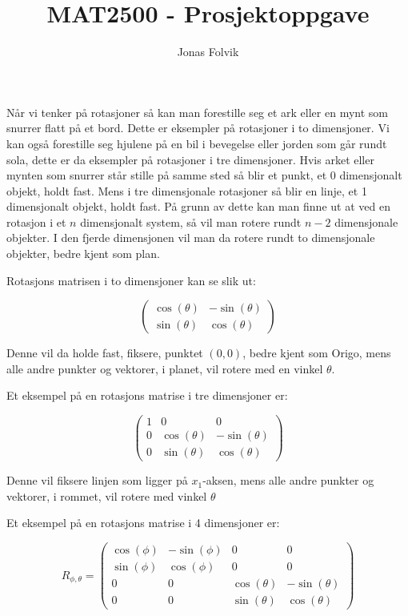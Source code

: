 \documentclass[a4paper,10pt,english]{article}
\title{MAT2500 - Prosjektoppgave}
\author{Jonas Folvik}
\begin{document}
    
    \maketitle

    Når vi tenker på rotasjoner så kan man forestille seg et ark eller en mynt som snurrer flatt på et bord. Dette er eksempler på rotasjoner i to dimensjoner.
    Vi kan også forestille seg hjulene på en bil i bevegelse eller jorden som går rundt sola, dette er da eksempler på rotasjoner i tre dimensjoner.
    Hvis arket eller mynten som snurrer står stille på samme sted så blir et punkt, et 0 dimensjonalt objekt, holdt fast. Mens i tre dimensjonale rotasjoner så blir en linje, et 1 dimensjonalt objekt, holdt fast.
    På grunn av dette kan man finne ut at ved en rotasjon i et $n$ dimensjonalt system, så vil man rotere rundt $n-2$ dimensjonale objekter.
    I den fjerde dimensjonen vil man da rotere rundt to dimensjonale objekter, bedre kjent som plan.

    Rotasjons matrisen i to dimensjoner kan se slik ut:

    $$
    \left(
    \begin{matrix}
        \cos(\theta) & -\sin(\theta) \\
        \sin(\theta) &  \cos(\theta)
    \end{matrix}
    \right)
    $$

    Denne vil da holde fast, fiksere, punktet $(0, 0)$, bedre kjent som Origo, mens alle andre punkter og vektorer, i planet, vil rotere med en vinkel $\theta$.
    
    Et eksempel på en rotasjons matrise i tre dimensjoner er:

    $$
    \left(
    \begin{matrix}
        1 & 0 & 0 \\
        0 & \cos(\theta) & -\sin(\theta) \\
        0 & \sin(\theta) &  \cos(\theta)
    \end{matrix}
    \right)
    $$

    Denne vil fiksere linjen som ligger på $x_{1}$-aksen, mens alle andre punkter og vektorer, i rommet, vil rotere med vinkel $\theta$

    Et eksempel på en rotasjons matrise i 4 dimensjoner er:

    $$
    R_{\phi, \theta} = \left(
    \begin{matrix}
        \cos(\phi) & -\sin(\phi) & 0 & 0 \\
        \sin(\phi) &  \cos(\phi) & 0 & 0 \\
        0 & 0 & \cos(\theta) & -\sin(\theta) \\
        0 & 0 & \sin(\theta) &  \cos(\theta)
    \end{matrix}
    \right)
    $$
\end{document}
